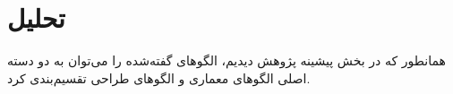 \section{تحلیل}
\label{analysis}
\begin{RTL}
همانطور که در بخش پیشینه پژوهش دیدیم، الگوهای گفته‌شده را
می‌توان به دو دسته اصلی الگوهای معماری و الگوهای طراحی تقسیم‌بندی کرد.
\end{RTL}

